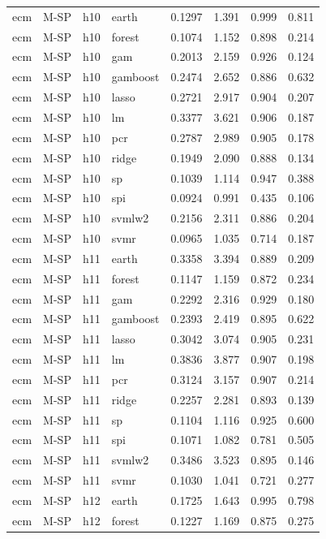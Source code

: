 \begin{ThreePartTable}
\begin{longtable}[t]{llclcccc}
ecm & M-SP & h10 & earth & 0.1297 & 1.391 & 0.999 & 0.811\\
ecm & M-SP & h10 & forest & 0.1074 & 1.152 & 0.898 & 0.214\\
ecm & M-SP & h10 & gam & 0.2013 & 2.159 & 0.926 & 0.124\\
ecm & M-SP & h10 & gamboost & 0.2474 & 2.652 & 0.886 & 0.632\\
ecm & M-SP & h10 & lasso & 0.2721 & 2.917 & 0.904 & 0.207\\
ecm & M-SP & h10 & lm & 0.3377 & 3.621 & 0.906 & 0.187\\
ecm & M-SP & h10 & pcr & 0.2787 & 2.989 & 0.905 & 0.178\\
ecm & M-SP & h10 & ridge & 0.1949 & 2.090 & 0.888 & 0.134\\
ecm & M-SP & h10 & sp & 0.1039 & 1.114 & 0.947 & 0.388\\
ecm & M-SP & h10 & spi & 0.0924 & 0.991 & 0.435 & 0.106\\
ecm & M-SP & h10 & svmlw2 & 0.2156 & 2.311 & 0.886 & 0.204\\
ecm & M-SP & h10 & svmr & 0.0965 & 1.035 & 0.714 & 0.187\\
\addlinespace
ecm & M-SP & h11 & earth & 0.3358 & 3.394 & 0.889 & 0.209\\
ecm & M-SP & h11 & forest & 0.1147 & 1.159 & 0.872 & 0.234\\
ecm & M-SP & h11 & gam & 0.2292 & 2.316 & 0.929 & 0.180\\
ecm & M-SP & h11 & gamboost & 0.2393 & 2.419 & 0.895 & 0.622\\
ecm & M-SP & h11 & lasso & 0.3042 & 3.074 & 0.905 & 0.231\\
ecm & M-SP & h11 & lm & 0.3836 & 3.877 & 0.907 & 0.198\\
ecm & M-SP & h11 & pcr & 0.3124 & 3.157 & 0.907 & 0.214\\
ecm & M-SP & h11 & ridge & 0.2257 & 2.281 & 0.893 & 0.139\\
ecm & M-SP & h11 & sp & 0.1104 & 1.116 & 0.925 & 0.600\\
ecm & M-SP & h11 & spi & 0.1071 & 1.082 & 0.781 & 0.505\\
ecm & M-SP & h11 & svmlw2 & 0.3486 & 3.523 & 0.895 & 0.146\\
ecm & M-SP & h11 & svmr & 0.1030 & 1.041 & 0.721 & 0.277\\
\addlinespace
ecm & M-SP & h12 & earth & 0.1725 & 1.643 & 0.995 & 0.798\\
ecm & M-SP & h12 & forest & 0.1227 & 1.169 & 0.875 & 0.275\\

\end{longtable}
\end{ThreePartTable}
